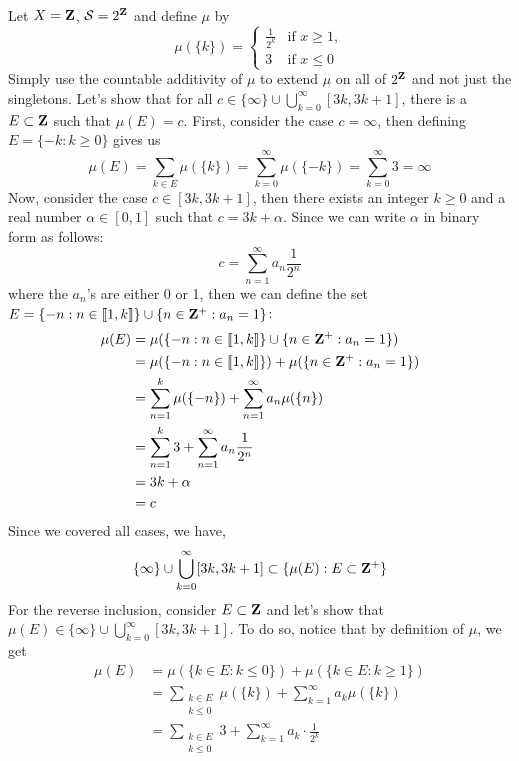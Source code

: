 \begin{solution}
    \\ Let $X = \mathbf{Z}$, $\mathcal{S} = 2^{\mathbf{Z}}$ and define $\mu$ by
    $$\mu(\{k\}) = \begin{cases}
        \frac{1}{2^k} & \text{if } x \geq 1, \\
        3 & \text{if } x\leq 0
    \end{cases}$$
    Simply use the countable additivity of $\mu$ to extend $\mu$ on all of $2^{\mathbf{Z}}$ and not just the singletons. Let's show that for all $c \in \{\infty\} \cup \bigcup_{k=0}^{\infty}[3k, 3k+1]$, there is a $E \subset \mathbf{Z}$ such that $\mu(E) = c$. First, consider the case $c = \infty$, then defining $E = \{-k : k \geq 0\}$ gives us
    $$\mu(E) = \sum_{k \in E}\mu(\{k\}) = \sum_{k=0}^{\infty}\mu(\{-k\}) = \sum_{k=0}^{\infty}3 = \infty$$
    Now, consider the case $c \in [3k, 3k+1]$, then there exists an integer $k \geq 0$ and a real number $\alpha \in [0, 1]$ such that $c = 3k + \alpha$. Since we can write $\alpha$ in binary form as follows:
    $$c = \sum_{n=1}^{\infty}a_n\frac{1}{2^n}$$
    where the $a_n$'s are either 0 or 1, then we can define the set $E = \{-n : n \in \llbracket 1 , k \rrbracket\} \cup \{n \in \mathbf{Z}^+ : a_n = 1\}$:
    \begin{align*}
        \mu(E) &= \mu(\{-n : n \in \llbracket 1 , k \rrbracket\} \cup \{n \in \mathbf{Z}^+ : a_n = 1\}) \\
        &= \mu(\{-n : n \in \llbracket 1 , k \rrbracket\}) + \mu(\{n \in \mathbf{Z}^+ : a_n = 1\}) \\
        &= \sum_{n = 1}^{k}\mu(\{-n\}) + \sum_{n=1}^{\infty}a_n \mu(\{n\})\\
        &= \sum_{n = 1}^{k}3 + \sum_{n=1}^{\infty}a_n \frac{1}{2^n}\\
        &= 3k + \alpha \\
        &= c
    \end{align*}
    Since we covered all cases, we have,
    $$\{\infty\} \cup \bigcup_{k=0}^{\infty}[3k, 3k+1] \subset \{ \mu(E) : E \subset \mathbf{Z}^+\}$$
    For the reverse inclusion, consider $E \subset \mathbf{Z}$ and let's show that $\mu(E) \in \{\infty\} \cup \bigcup_{k=0}^{\infty}[3k, 3k+1]$. To do so, notice that by definition of $\mu$, we get
    \begin{align*}
        \mu(E) &= \mu(\{k \in E : k\leq 0\}) + \mu(\{k \in E : k\geq 1\}) \\
        &= \sum_{\substack{k \in E \\ k \leq 0 }}\mu(\{k\}) + \sum_{k=1}^{\infty}a_k\mu(\{k\}) \\
        &= \sum_{\substack{k \in E \\ k \leq 0 }}3 + \sum_{k=1}^{\infty}a_k \cdot \frac{1}{2^k} \\

\end{align*}
\end{solution}
